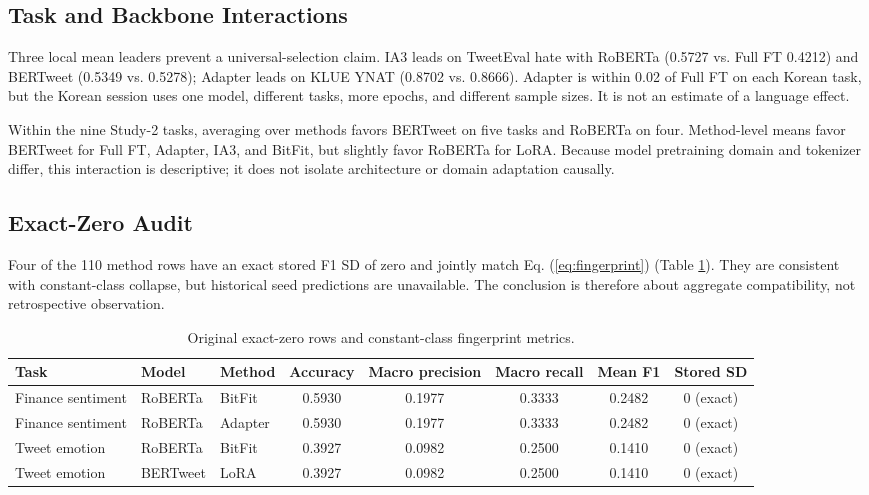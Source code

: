 \documentclass{SPC}
\begin{document}
\subsection{Task and Backbone Interactions}

Three local mean leaders prevent a universal-selection claim. IA3 leads on TweetEval hate with RoBERTa (0.5727 vs. Full FT 0.4212) and BERTweet (0.5349 vs. 0.5278); Adapter leads on KLUE YNAT (0.8702 vs. 0.8666). Adapter is within 0.02 of Full FT on each Korean task, but the Korean session uses one model, different tasks, more epochs, and different sample sizes. It is not an estimate of a language effect.

Within the nine Study-2 tasks, averaging over methods favors BERTweet on five tasks and RoBERTa on four. Method-level means favor BERTweet for Full FT, Adapter, IA3, and BitFit, but slightly favor RoBERTa for LoRA. Because model pretraining domain and tokenizer differ, this interaction is descriptive; it does not isolate architecture or domain adaptation causally.

\subsection{Exact-Zero Audit}

Four of the 110 method rows have an exact stored F1 SD of zero and jointly match Eq. (\ref{eq:fingerprint}) (Table \ref{tab:zero-sd}). They are consistent with constant-class collapse, but historical seed predictions are unavailable. The conclusion is therefore about aggregate compatibility, not retrospective observation.

\begin{table}[!t]
\caption{Original exact-zero rows and constant-class fingerprint metrics.}
\label{tab:zero-sd}
\centering
\scriptsize
\setlength{\tabcolsep}{3.5pt}
\begin{tabular}{lllccccc}
\toprule
Task & Model & Method & Accuracy & Macro precision & Macro recall & Mean F1 & Stored SD \\
\midrule
Finance sentiment & RoBERTa & BitFit & 0.5930 & 0.1977 & 0.3333 & 0.2482 & 0 (exact) \\
Finance sentiment & RoBERTa & Adapter & 0.5930 & 0.1977 & 0.3333 & 0.2482 & 0 (exact) \\
Tweet emotion & RoBERTa & BitFit & 0.3927 & 0.0982 & 0.2500 & 0.1410 & 0 (exact) \\
Tweet emotion & BERTweet & LoRA & 0.3927 & 0.0982 & 0.2500 & 0.1410 & 0 (exact) \\
\bottomrule
\end{tabular}
\end{table}
\end{document}
